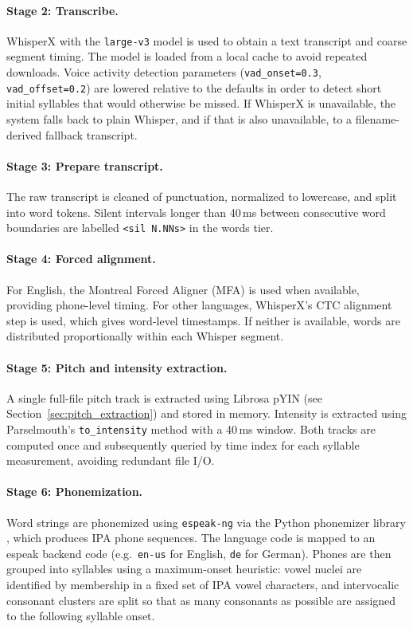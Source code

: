 \paragraph{Stage 2: Transcribe.}
WhisperX with the \texttt{large-v3} model is used to obtain a text transcript
and coarse segment timing. The model is loaded from a local cache to avoid
repeated downloads. Voice activity detection parameters
(\texttt{vad\_onset=0.3}, \texttt{vad\_offset=0.2}) are lowered relative to the
defaults in order to detect short initial syllables that would otherwise be
missed. If WhisperX is unavailable, the system falls back to plain Whisper, and
if that is also unavailable, to a filename-derived fallback transcript.

\paragraph{Stage 3: Prepare transcript.}
The raw transcript is cleaned of punctuation, normalized to lowercase, and split
into word tokens. Silent intervals longer than 40\,ms between consecutive word
boundaries are labelled \texttt{<sil N.NNs>} in the words tier.

\paragraph{Stage 4: Forced alignment.}
For English, the Montreal Forced Aligner (MFA) is used when available, providing
phone-level timing. For other languages, WhisperX's CTC alignment step is used,
which gives word-level timestamps. If neither is available, words are distributed
proportionally within each Whisper segment.

\paragraph{Stage 5: Pitch and intensity extraction.}
A single full-file pitch track is extracted using Librosa pYIN (see
Section~\ref{sec:pitch_extraction}) and stored in memory. Intensity is extracted
using Parselmouth's \texttt{to\_intensity} method with a 40\,ms window. Both
tracks are computed once and subsequently queried by time index for each syllable
measurement, avoiding redundant file I/O.

\paragraph{Stage 6: Phonemization.}
Word strings are phonemized using \texttt{espeak-ng} via the Python phonemizer
library \cite{barnard2021phonemizer}, which produces IPA phone sequences. The
language code is mapped to an espeak backend code (e.g.\ \texttt{en-us} for
English, \texttt{de} for German). Phones are then grouped into syllables using a
maximum-onset heuristic: vowel nuclei are identified by membership in a fixed set
of IPA vowel characters, and intervocalic consonant clusters are split so that as
many consonants as possible are assigned to the following syllable onset.

